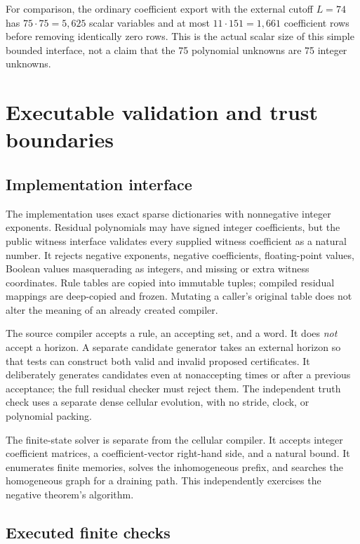 \documentclass[11pt,letterpaper]{article}
\numberwithin{equation}{section}
\theoremstyle{definition}
\begin{document}
For comparison, the ordinary coefficient export with the external cutoff
$L=74$ has $75\cdot75=5{,}625$ scalar variables and at most
$11\cdot151=1{,}661$ coefficient rows before removing identically zero
rows. This is the actual scalar size of this simple bounded interface,
not a claim that the 75 polynomial unknowns are 75 integer unknowns.

\section{Executable validation and trust boundaries}
\label{pwh:oc:sec:validation}

\subsection{Implementation interface}

The implementation uses exact sparse dictionaries with nonnegative
integer exponents. Residual polynomials may have signed integer
coefficients, but the public witness interface validates every supplied
witness coefficient as a natural number. It rejects negative exponents,
negative coefficients, floating-point values, Boolean values masquerading
as integers, and missing or extra witness coordinates. Rule tables are
copied into immutable tuples; compiled residual mappings are deep-copied
and frozen. Mutating a caller's original table does not alter the meaning
of an already created compiler.

The source compiler accepts a rule, an accepting set, and a word. It does
\emph{not} accept a horizon. A separate candidate generator takes an
external horizon so that tests can construct both valid and invalid
proposed certificates. It deliberately generates candidates even at
nonaccepting times or after a previous acceptance; the full residual
checker must reject them. The independent truth check uses a separate
dense cellular evolution, with no stride, clock, or polynomial packing.

The finite-state solver is separate from the cellular compiler. It
accepts integer coefficient matrices, a coefficient-vector right-hand
side, and a natural bound. It enumerates finite memories, solves the
inhomogeneous prefix, and searches the homogeneous graph for a draining
path. This independently exercises the negative theorem's algorithm.

\subsection{Executed finite checks}
\end{document}
